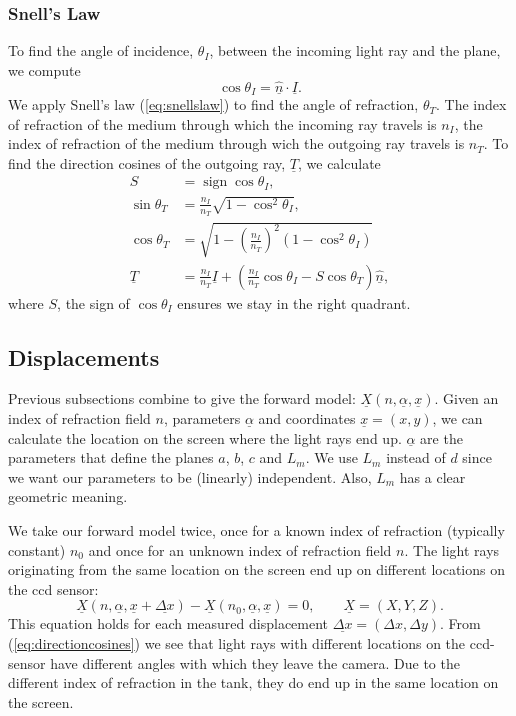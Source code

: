 \documentclass{article}
\DeclareMathOperator{\sign}{sign}
\begin{document}
\subsubsection{Snell's Law}
To find the angle of incidence, $\theta_I$, between the incoming light ray and the plane, we compute
\begin{equation}
	\cos \theta_I = \underline{\hat{n}} \cdot \underline{I}.
\end{equation}
We apply Snell's law (\ref{eq:snellslaw}) to find the angle of refraction, $\theta_T$. The index of refraction of the medium through which the incoming ray travels is $n_I$, the index of refraction of the medium through wich the outgoing ray travels is $n_T$. To find the direction cosines of the outgoing ray, $\underline{T}$, we calculate 
\begin{align}
	S &= \sign \cos \theta_I, \\
	\sin \theta_T &= \frac{n_I}{n_T} \sqrt{1-\cos^2 \theta_I}, \\
	\cos \theta_T &= \sqrt{1-\left(\frac{n_I}{n_T}\right)^2(1-\cos^2 \theta_I)} \\
	\underline{T} &= \frac{n_I}{n_T} \underline{I} + \left(\frac{n_I}{n_T} \cos \theta_I - S \cos\theta_T\right)\underline{\hat{n}},	
\end{align}
where $S$, the sign of $\cos\theta_I$ ensures we stay in the right quadrant.

\subsection{Displacements}
Previous subsections combine to give the forward model: $\underline{X}(n,\underline{\alpha}, \underline{x})$. Given an index of refraction field $n$, parameters $\underline{\alpha}$ and coordinates $\underline{x} = (x,y)$, we can calculate the location on the screen where the light rays end up. $\underline{\alpha}$ are the parameters that define the planes $a$, $b$, $c$ and $L_m$. We use $L_m$ instead of $d$ since we want our parameters to be (linearly) independent. Also, $L_m$ has a clear geometric meaning.

We take our forward model twice, once for a known index of refraction (typically constant) $n_0$ and once for an unknown index of refraction field $n$. The light rays originating from the same location on the screen end up on different locations on the ccd sensor:
\begin{equation}
\label{eq:ForwardModel}
	 \underline{X}(n, \underline{\alpha}, \underline{x}+\underline{\Delta x}) - \underline{X}(n_0, \underline{\alpha}, \underline{x}) = 0, \qquad \underline{X} = (X, Y, Z).
\end{equation}
This equation holds for each measured displacement $\underline{\Delta x} = (\Delta x, \Delta y)$. From (\ref{eq:directioncosines}) we see that light rays with different locations on the ccd-sensor have different angles with which they leave the camera. Due to the different index of refraction in the tank, they do end up in the same location on the screen.
\end{document}
